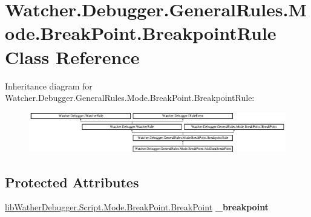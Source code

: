 \hypertarget{class_watcher_1_1_debugger_1_1_general_rules_1_1_mode_1_1_break_point_1_1_breakpoint_rule}{\section{Watcher.\+Debugger.\+General\+Rules.\+Mode.\+Break\+Point.\+Breakpoint\+Rule Class Reference}
\label{class_watcher_1_1_debugger_1_1_general_rules_1_1_mode_1_1_break_point_1_1_breakpoint_rule}
}
Inheritance diagram for Watcher.\+Debugger.\+General\+Rules.\+Mode.\+Break\+Point.\+Breakpoint\+Rule\+:\begin{figure}[H]
\begin{center}
\leavevmode
\includegraphics[height=1.769352cm]{class_watcher_1_1_debugger_1_1_general_rules_1_1_mode_1_1_break_point_1_1_breakpoint_rule}
\end{center}
\end{figure}
\subsection*{Protected Attributes}
\begin{DoxyCompactItemize}
\item 
\hypertarget{class_watcher_1_1_debugger_1_1_general_rules_1_1_mode_1_1_break_point_1_1_breakpoint_rule_ab30d69127870a74ee366d1dc36aa693f}{\hyperlink{classlib_wather_debugger_1_1_script_1_1_mode_1_1_break_point_1_1_break_point}{lib\+Wather\+Debugger.\+Script.\+Mode.\+Break\+Point.\+Break\+Point} {\bfseries \+\_\+breakpoint}}\label{class_watcher_1_1_debugger_1_1_general_rules_1_1_mode_1_1_break_point_1_1_breakpoint_rule_ab30d69127870a74ee366d1dc36aa693f}

\end{DoxyCompactItemize}
